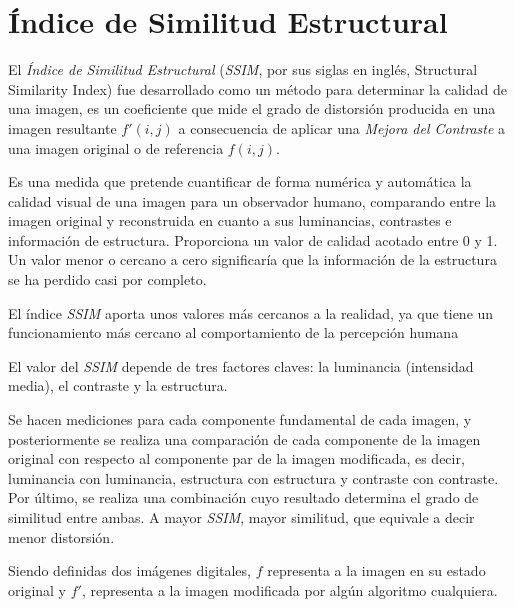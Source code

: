 \section{Índice de Similitud Estructural} 
\label{sec:ssim}

El \textit{Índice de Similitud Estructural} (\textit{SSIM}, por sus siglas en inglés, Structural Similarity Index) \cite{wang2004} fue desarrollado como un método para determinar la calidad de una imagen, es un coeficiente que mide el grado de distorsión producida en una imagen resultante $f'(i,j)$ a consecuencia de aplicar una \textit{Mejora del Contraste} a una imagen original o de referencia $f(i,j)$. 

Es una medida que pretende cuantificar de forma numérica y automática la calidad visual de una imagen para un observador humano, comparando entre la imagen original y reconstruida en cuanto a sus luminancias, contrastes e información de estructura. Proporciona un valor de calidad acotado entre 0 y 1. Un valor menor o cercano a cero significaría que la información de la estructura se ha perdido casi por completo.


El índice \textit{SSIM} aporta unos valores más cercanos a la realidad, ya que tiene un funcionamiento más cercano al comportamiento de la percepción humana \cite{wang2009}



El valor del \textit{SSIM} depende de tres factores claves: la luminancia (intensidad media), el contraste y la estructura. 

Se hacen mediciones para cada componente fundamental de cada imagen, y posteriormente se realiza una comparación de cada componente de la imagen original con respecto al componente par de la imagen modificada, es decir, luminancia con luminancia, estructura con estructura y contraste con contraste. Por último, se realiza una combinación cuyo resultado determina el grado de similitud entre ambas. A mayor \textit{SSIM}, mayor similitud, que equivale a decir menor distorsión.

Siendo definidas dos imágenes digitales, $f$ representa a la imagen en su estado original y $f'$, representa a la imagen modificada por algún algoritmo cualquiera.

